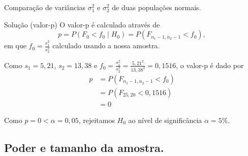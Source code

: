\documentclass[9pt]{beamer}
\begin{document}
\begin{frame}{Comparação de variâncias $\sigma_1^2$ e $\sigma_2^2$ de duas populações normais.}

\begin{block}{Solução (valor-p)}
	O valor-p é calculado através de
	$$p=P\left( F_0 < f_0 \mid H_0 \right) = P\left( F_{n_1-1, n_2-1} < f_0 \right),$$
	em que $f_0 = \frac{s_1^2}{s_2^2}$ calculado usando a  nossa amostra.
	
	Como $s_1=5,21$, $s_2 = 13,38$ e $f_0 = \frac{s_1^2}{s_2^2} = \frac{5,21^2}{13,38^2} = 0,1516$, o valor-p é dado por
	\begin{align*}
		p &= P\left( F_{n_1-1, n_2-1} < f_0 \right)\\
		&= P\left(F_{25, 20} < 0,1516\right)\\
		&= 0
	\end{align*}
	
	Como $p=0<\alpha=0,05$, rejeitamos $H_0$ ao nível de significância $\alpha=5\%$.
\end{block}
\end{frame}

\subsection{Poder e tamanho da amostra.}
\end{document}
